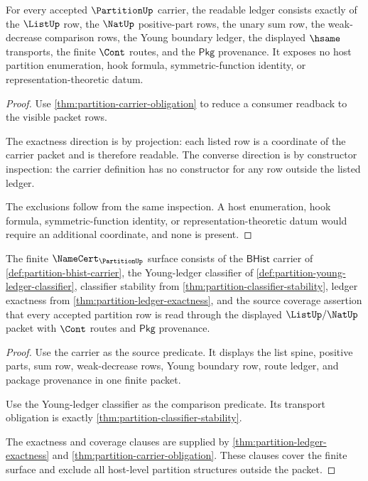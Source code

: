 \begin{theorem}
\label{thm:partition-ledger-exactness}
For every accepted $\PartitionUp$ carrier, the readable ledger consists
exactly of the $\ListUp$ row, the $\NatUp$ positive-part rows, the unary sum
row, the weak-decrease comparison rows, the Young boundary ledger, the
displayed $\hsame$ transports, the finite $\Cont$ routes, and the
$\mathsf{Pkg}$ provenance. It exposes no host partition enumeration, hook
formula, symmetric-function identity, or representation-theoretic datum.
\end{theorem}
\begin{proof}
Use \autoref{thm:partition-carrier-obligation} to reduce a consumer readback to
the visible packet rows.

The exactness direction is by projection: each listed row is a coordinate of
the carrier packet and is therefore readable. The converse direction is by
constructor inspection: the carrier definition has no constructor for any row
outside the listed ledger.

The exclusions follow from the same inspection. A host enumeration, hook
formula, symmetric-function identity, or representation-theoretic datum would
require an additional coordinate, and none is present.
\end{proof}

\begin{theorem}
\label{thm:partition-finite-namecert-surface}
The finite $\NameCert_{\PartitionUp}$ surface consists of the
$\mathsf{BHist}$ carrier of \autoref{def:partition-bhist-carrier}, the
Young-ledger classifier of
\autoref{def:partition-young-ledger-classifier}, classifier stability from
\autoref{thm:partition-classifier-stability}, ledger exactness from
\autoref{thm:partition-ledger-exactness}, and the source coverage assertion
that every accepted partition row is read through the displayed
$\ListUp/\NatUp$ packet with $\Cont$ routes and $\mathsf{Pkg}$ provenance.
\end{theorem}
\begin{proof}
Use the carrier as the source predicate. It displays the list spine, positive
parts, sum row, weak-decrease rows, Young boundary row, route ledger, and
package provenance in one finite packet.

Use the Young-ledger classifier as the comparison predicate. Its transport
obligation is exactly \autoref{thm:partition-classifier-stability}.

The exactness and coverage clauses are supplied by
\autoref{thm:partition-ledger-exactness} and
\autoref{thm:partition-carrier-obligation}. These clauses cover the finite
surface and exclude all host-level partition structures outside the packet.
\end{proof}

